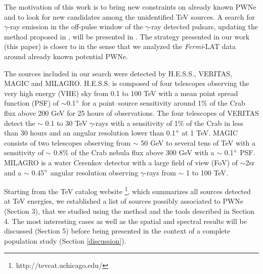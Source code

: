 The motivation of this work is to bring new constraints on already known PWNe and to look for new candidates among the unidentified TeV sources. A search for $\gamma$-ray emission in the off-pulse window of the $\gamma$-ray detected pulsars, updating the method proposed in \cite{2011ApJ...726...35A}, will be presented in \cite{2PC}. The strategy presented in our work (this paper) is closer to \cite{2010AA...518A...8T} in the sense that we analyzed the \emph{Fermi}-LAT data around already known potential PWNe.

The sources included in our search were detected by H.E.S.S., VERITAS, MAGIC and MILAGRO. H.E.S.S. \citep{2006AA...457..899A} is composed of four telescopes observing the very high energy (VHE) sky from 0.1 to 100 TeV with a mean point spread function (PSF) of $\sim$0.1$\mbox{$^\circ$}$ for a point--source sensitivity around 1$\%$ of the Crab flux above 200 GeV for 25 hours of observations. The four telescopes of VERITAS \citep{2002APh....17..221W} detect the $\sim$ 0.1 to 30 TeV $\gamma$-rays with a sensitivity of 1$\%$ of the Crab in less than 30 hours and an angular resolution lower than 0.1$\mbox{$^\circ$}$ at 1 TeV. MAGIC \citep{2012APh....35..435A} consists of two telescopes observing from $\sim$ 50 GeV to several tens of TeV with a sensitivity of $\sim$ 0.8$\%$ of the Crab nebula flux above 300 GeV with a $\sim$ 0.1$\mbox{$^\circ$}$ PSF. MILAGRO \citep{2004ApJ...608..680A} is a water $\breve{C}$erenkov detector with a large field of view (FoV) of $\sim$2sr and a $\sim$ 0.45$\mbox{$^\circ$}$ angular resolution observing $\gamma$-rays from $\sim$ 1 to 100 TeV. 

%

Starting from the TeV catalog website \footnote{http://tevcat.uchicago.edu/}, which summarizes all sources detected at TeV energies, we established a list of sources possibly associated to PWNe (Section 3), that we studied using the method and the tools described in Section 4. The most interesting cases as well as the spatial and spectral results will be discussed (Section 5) before being presented in the context of a complete population study (Section \ref{discussion}).

